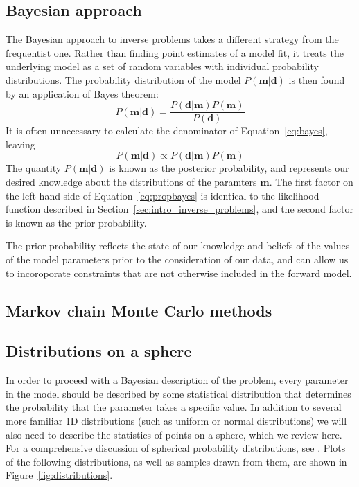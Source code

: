 \documentclass[preprint,12pt,authoryear]{elsarticle}
\begin{document}
\subsection{Bayesian approach}

The Bayesian approach to inverse problems takes a different strategy from the frequentist one.
Rather than finding point estimates of a model fit, it treats the underlying model
as a set of random variables with individual probability distributions.
The probability distribution of the model $P(\mathbf{m} \vert \mathbf{d})$ 
is then found by an application of Bayes theorem:
\begin{equation}
P\left(\mathbf{m} \vert \mathbf{d} \right) = \frac{ P \left(\mathbf{d}\vert \mathbf{m} \right) P \left( \mathbf{m} \right) }{P \left( \mathbf{d}\right)}
\label{eq:bayes}
\end{equation}
It is often unnecessary to calculate the denominator of Equation~\eqref{eq:bayes}, leaving
\begin{equation}
P\left(\mathbf{m} \vert \mathbf{d} \right) \propto P \left( \mathbf{d} \vert \mathbf{m} \right) P \left( \mathbf{m} \right) 
\label{eq:propbayes}
\end{equation}
The quantity $P(\mathbf{m} \vert \mathbf{d})$ is known as the posterior probability,
and represents our desired knowledge about the distributions of the paramters $\mathbf{m}$.
The first factor on the left-hand-side of Equation~\eqref{eq:propbayes} is identical to the likelihood
function described in Section~\ref{sec:intro_inverse_problems}, and the second factor
is known as the prior probability.

The prior probability reflects the state of our knowledge and beliefs of the values
of the model parameters prior to the consideration of our data, and can allow us
to incoroporate constraints that are not otherwise included in the forward model.

\subsection{Markov chain Monte Carlo methods}


\subsection{Distributions on a sphere}

In order to proceed with a Bayesian description of the problem, every parameter
in the model should be described by some statistical distribution that determines
the probability that the parameter takes a specific value.
In addition to several more familiar 1D distributions (such as uniform or normal distributions)
we will also need to describe the statistics of points on a sphere, which we 
review here. For a comprehensive discussion of spherical probability distributions,
see \citet{fisher1987statistical}. Plots of the following distributions, as well as
samples drawn from them, are shown in Figure~\ref{fig:distributions}. 
\end{document}

